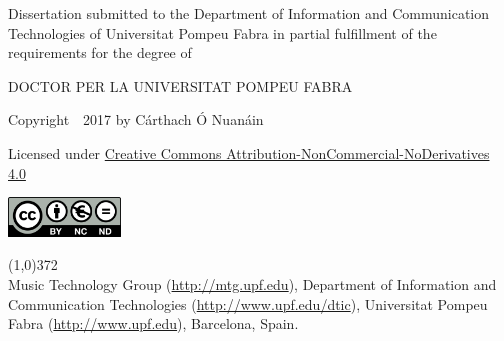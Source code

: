 \cleartorecto
\thispagestyle{empty}

\vspace*{02cm}

Dissertation submitted to the Department of Information and Communication Technologies of Universitat Pompeu Fabra in partial fulfillment of the requirements for the degree of

\vspace*{0.5cm}

\centerline{DOCTOR PER LA UNIVERSITAT POMPEU FABRA}


\vspace*{4cm}


{\centering

	Copyright~\textcopyright~2017 by C\'{a}rthach \'{O} Nuan\'{a}in

	Licensed under \href{http://creativecommons.org/licenses/by-nc-nd/4.0/}{Creative Commons Attribution-NonCommercial-NoDerivatives 4.0}

	\vspace{0.5cm}

	\href{http://creativecommons.org/licenses/by-nc-nd/4.0/}
	{
		\centering
		\includegraphics[width=3cm]{ch00/figures/creative-commons.png}
		}

}

\vspace*{\fill}

\line(1,0){372}\\
\footnotesize
Music Technology Group (\url{http://mtg.upf.edu}), Department of Information and Communication Technologies (\url{http://www.upf.edu/dtic}), Universitat Pompeu Fabra (\url{http://www.upf.edu}), Barcelona, Spain.
\normalsize



